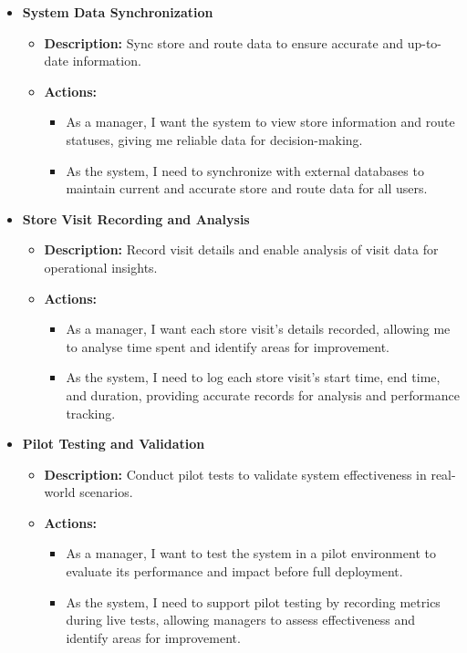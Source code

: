 \begin{itemize}
    \item \textbf{System Data Synchronization}
    \begin{itemize}
        \item \textbf{Description:} Sync store and route data to ensure accurate and up-to-date information.
        \item \textbf{Actions:}
        \begin{itemize}
            \item As a manager, I want the system to view store information and route statuses, giving me reliable data for decision-making.
            \item As the system, I need to synchronize with external databases to maintain current and accurate store and route data for all users.
        \end{itemize}
    \end{itemize}
    
    \item \textbf{Store Visit Recording and Analysis}
    \begin{itemize}
        \item \textbf{Description:} Record visit details and enable analysis of visit data for operational insights.
        \item \textbf{Actions:}
        \begin{itemize}
            \item As a manager, I want each store visit’s details recorded, allowing me to analyse time spent and identify areas for improvement.
            \item As the system, I need to log each store visit's start time, end time, and duration, providing accurate records for analysis and performance tracking.
        \end{itemize}
    \end{itemize}
    
    \item \textbf{Pilot Testing and Validation}
    \begin{itemize}
        \item \textbf{Description:} Conduct pilot tests to validate system effectiveness in real-world scenarios.
        \item \textbf{Actions:}
        \begin{itemize}
            \item As a manager, I want to test the system in a pilot environment to evaluate its performance and impact before full deployment.
            \item As the system, I need to support pilot testing by recording metrics during live tests, allowing managers to assess effectiveness and identify areas for improvement.
        \end{itemize}
    \end{itemize}
    
\end{itemize}

